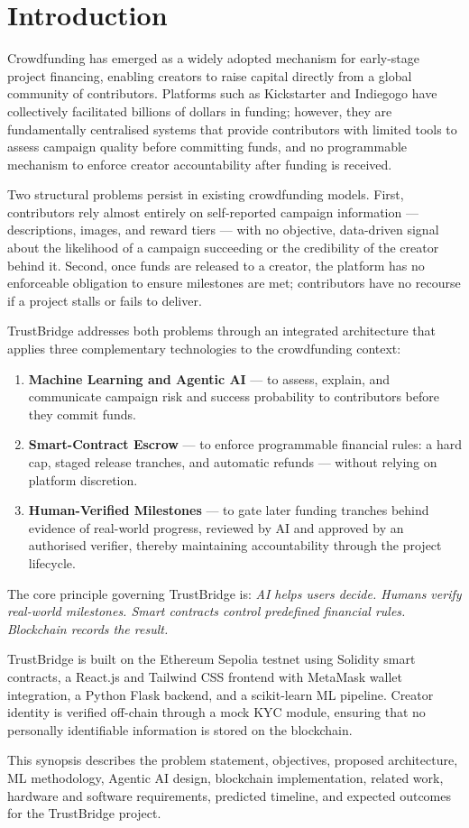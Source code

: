 \chapter{Introduction}

Crowdfunding has emerged as a widely adopted mechanism for early-stage project financing, enabling creators to raise capital directly from a global community of contributors. Platforms such as Kickstarter and Indiegogo have collectively facilitated billions of dollars in funding; however, they are fundamentally centralised systems that provide contributors with limited tools to assess campaign quality before committing funds, and no programmable mechanism to enforce creator accountability after funding is received.

Two structural problems persist in existing crowdfunding models. First, contributors rely almost entirely on self-reported campaign information — descriptions, images, and reward tiers — with no objective, data-driven signal about the likelihood of a campaign succeeding or the credibility of the creator behind it. Second, once funds are released to a creator, the platform has no enforceable obligation to ensure milestones are met; contributors have no recourse if a project stalls or fails to deliver.

TrustBridge addresses both problems through an integrated architecture that applies three complementary technologies to the crowdfunding context:

\begin{enumerate}
    \item \textbf{Machine Learning and Agentic AI} — to assess, explain, and communicate campaign risk and success probability to contributors before they commit funds.
    \item \textbf{Smart-Contract Escrow} — to enforce programmable financial rules: a hard cap, staged release tranches, and automatic refunds — without relying on platform discretion.
    \item \textbf{Human-Verified Milestones} — to gate later funding tranches behind evidence of real-world progress, reviewed by AI and approved by an authorised verifier, thereby maintaining accountability through the project lifecycle.
\end{enumerate}

The core principle governing TrustBridge is: \textit{AI helps users decide. Humans verify real-world milestones. Smart contracts control predefined financial rules. Blockchain records the result.}

TrustBridge is built on the Ethereum Sepolia testnet using Solidity smart contracts, a React.js and Tailwind CSS frontend with MetaMask wallet integration, a Python Flask backend, and a scikit-learn ML pipeline. Creator identity is verified off-chain through a mock KYC module, ensuring that no personally identifiable information is stored on the blockchain.

This synopsis describes the problem statement, objectives, proposed architecture, ML methodology, Agentic AI design, blockchain implementation, related work, hardware and software requirements, predicted timeline, and expected outcomes for the TrustBridge project.
